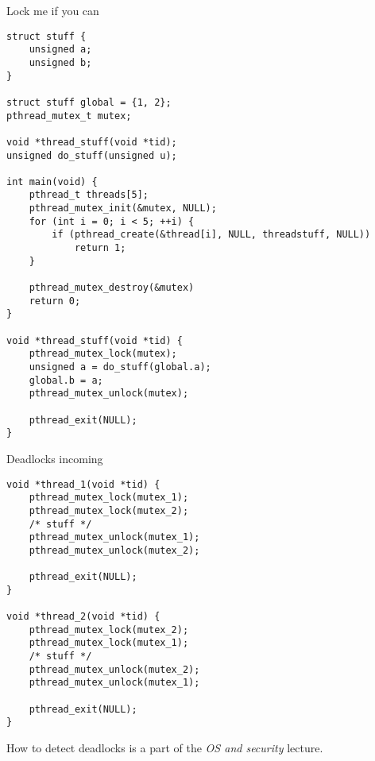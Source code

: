 \begin{frame}[fragile = singleslide]{Lock me if you can}
    \begin{lstlisting}[basicstyle=\tiny]
struct stuff {
    unsigned a;
    unsigned b;
}

struct stuff global = {1, 2};
pthread_mutex_t mutex;

void *thread_stuff(void *tid);
unsigned do_stuff(unsigned u);

int main(void) {
    pthread_t threads[5];
    pthread_mutex_init(&mutex, NULL);
    for (int i = 0; i < 5; ++i) {
        if (pthread_create(&thread[i], NULL, threadstuff, NULL))
            return 1;
    }
    
    pthread_mutex_destroy(&mutex)
    return 0;
}

void *thread_stuff(void *tid) {
    pthread_mutex_lock(mutex);
    unsigned a = do_stuff(global.a);
    global.b = a;
    pthread_mutex_unlock(mutex);
    
    pthread_exit(NULL);
}
\end{lstlisting}
\end{frame}

\begin{frame}[fragile = singleslide]{Deadlocks incoming}
     \begin{lstlisting}[basicstyle=\scriptsize]
void *thread_1(void *tid) {
    pthread_mutex_lock(mutex_1);
    pthread_mutex_lock(mutex_2);
    /* stuff */
    pthread_mutex_unlock(mutex_1);
    pthread_mutex_unlock(mutex_2);
    
    pthread_exit(NULL);
}

void *thread_2(void *tid) {
    pthread_mutex_lock(mutex_2);
    pthread_mutex_lock(mutex_1);
    /* stuff */
    pthread_mutex_unlock(mutex_2);
    pthread_mutex_unlock(mutex_1);
    
    pthread_exit(NULL);
}
	\end{lstlisting}
	How to detect deadlocks is a part of the \textit{OS and security} lecture.
\end{frame}


